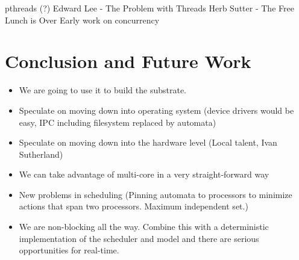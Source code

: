 \documentclass[letterpaper]{article}
\begin{document}
pthreads (?)
Edward Lee - The Problem with Threads
Herb Sutter - The Free Lunch is Over
Early work on concurrency

\section{Conclusion and Future Work\label{conclusion}}

\begin{itemize}
  \item We are going to use it to build the substrate.
  \item Speculate on moving down into operating system (device drivers would be easy, IPC including filesystem replaced by automata)
  \item Speculate on moving down into the hardware level (Local talent, Ivan Sutherland)
  \item We can take advantage of multi-core in a very straight-forward way
  \item New problems in scheduling (Pinning automata to processors to minimize actions that span two processors.  Maximum independent set.)
  \item We are non-blocking all the way.  Combine this with a deterministic implementation of the scheduler and model and there are serious opportunities for real-time.
\end{itemize}
\end{document}
